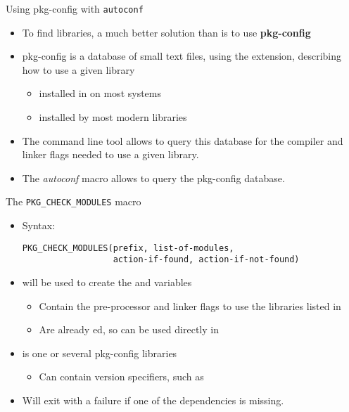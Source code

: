 \begin{frame}{Using pkg-config with {\tt autoconf}}

  \begin{itemize}

  \item To find libraries, a much better solution than
     is to use {\bf pkg-config}

  \item pkg-config is a database of small text files, using the
     extension, describing how to use a given library
    \begin{itemize}
    \item installed in  on most systems
    \item installed by most modern libraries
    \end{itemize}

  \item The  command line tool allows to query this
    database for the compiler and linker flags needed to use a given
    library.

  \item The  {\em autoconf} macro allows to
    query the pkg-config database.

  \end{itemize}

\end{frame}

\begin{frame}[fragile]{The {\tt PKG\_CHECK\_MODULES} macro}
\begin{itemize}
\item Syntax:
  \begin{block}{}
\begin{verbatim}
PKG_CHECK_MODULES(prefix, list-of-modules,
                  action-if-found, action-if-not-found)
\end{verbatim}
  \end{block}
\item {} will be used to create the
   and  variables
  \begin{itemize}
  \item Contain the pre-processor and linker flags to use the
    libraries listed in 
  \item Are already ed, so can be used directly in
  \end{itemize}
\item {} is one or several pkg-config libraries
  \begin{itemize}
  \item Can contain version specifiers, such as 
  \end{itemize}
\item Will exit with a failure if one of the dependencies is missing.
\end{itemize}
\end{frame}

